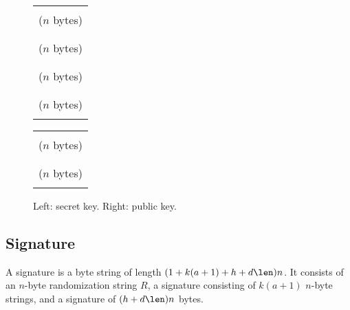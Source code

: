 \begin{figure} [h]
  \begin{center}
  \begin{minipage}{.4\textwidth}
        \begin{center}
	  \begin{tabular}{|c|}
	    \hline
	    \\[-0.5em] \sseed ($n$ bytes) \\[-0.5em] \\ \hline
	    \\[-0.5em] \skprf ($n$ bytes) \\[-0.5em] \\ \hline
	    \\[-0.5em] \pseed ($n$ bytes) \\[-0.5em] \\ \hline
	    \\[-0.5em] \proot ($n$ bytes) \\[-0.5em] \\ \hline
	  \end{tabular}
        \end{center}
      \end{minipage}
  \begin{minipage}{.4\textwidth}
      \begin{center}
	\begin{tabular}{|c|}
	    \hline
	    \\[-0.5em] \pseed ($n$ bytes) \\[-0.5em] \\ \hline
	    \\[-0.5em] \proot ($n$ bytes) \\[-0.5em] \\ \hline
	  \end{tabular}
        \end{center}
      \end{minipage}
  \end{center}
  \caption{Left: \spx secret key. Right: \spx public key.}
  \label{fig:spx:keys}
\end{figure}

\subsection{\spx Signature}

   A \spx signature \htsig is a byte string of length $(1 + k(a + 1) + h + d\len)n$.
   It consists of an $n$-byte randomization string $R$, a \fors signature
   \forssig consisting of $k(a+1)$ $n$-byte strings, and a \hyper signature \htsig
   of $(h + d\len)n$ bytes.


